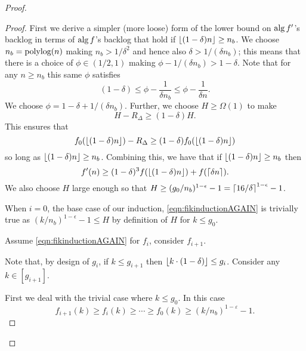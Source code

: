 \begin{proof}
{\begin{proof}
  First we derive a simpler (more loose) form of the lower bound
  on $\operatorname{\text{\textup{alg}}}{f'}$'s backlog in terms of $\operatorname{\text{\textup{alg}}}{f}$'s backlog that
  hold if  $\left\lfloor (1-\delta)n \right\rfloor \ge n_b$. We choose $n_b=
  \operatorname{\text{polylog}}(n)$ making $n_b > 1/\delta^2$ and hence also $\delta >
  1/(\delta n_b)$; this means that there is a choice of $\phi \in
  (1/2, 1)$ making $\phi - 1/(\delta n_b) > 1-\delta$. Note that
  for any $n\ge n_b$ this same $\phi$ satisfies $$(1-\delta) \le
  \phi - \frac{1}{\delta n_b} \le \phi - \frac{1}{ \delta n}.$$
  We choose $\phi = 1-\delta + 1/(\delta n_b)$. Further, we
  choose $H \ge \Omega(1)$ to make $$ H - R_\Delta \ge
  (1-\delta)H.$$ This ensures that $$f_0(\left\lfloor (1-\delta) n \right\rfloor) -
  R_\Delta \ge (1-\delta)f_0(\left\lfloor (1-\delta)n \right\rfloor)$$ so long as
  $\left\lfloor (1-\delta)n \right\rfloor \ge n_b$. Combining this, we have that if
  $\left\lfloor (1-\delta)n \right\rfloor\ge n_b$ then 
  \begin{equation}
    \label{eq:simpleramplemmaobliviousforthmpf}
  f'(n) \ge (1-\delta)^3 f(\left\lfloor (1-\delta)n \right\rfloor) + f(\left\lceil \delta n \right\rceil).
  \end{equation}
  We also choose $H$ large enough so that $H \ge
  (g_0/n_b)^{1-\epsilon}-1 = \left\lceil 16/\delta \right\rceil^{1-\epsilon}-1$.

  When $i=0$, the base case of our induction,
  \eqref{eqn:fikinductionAGAIN} is trivially true as
  $(k/n_b)^{1-\epsilon} - 1 \le H$ by definition of $H$ for $k\le g_0$.

  Assume \eqref{eqn:fikinductionAGAIN} for $f_i$, consider $f_{i+1}$. 

  Note that, by design of $g_i$, if $k \le g_{i+1}$ then $\left\lfloor k\cdot (1-\delta) \right\rfloor \le g_i$.
  Consider any $k\in [g_{i+1}]$. 

  First we deal with the trivial
  case where $k \le g_0$. In this case
  $$f_{i+1}(k) \ge f_i(k) \ge \cdots \ge f_0(k) \ge (k/n_b)^{1-\varepsilon} -1.$$


\end{proof}}
\end{proof}
